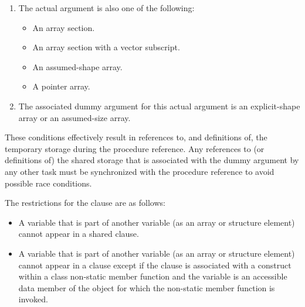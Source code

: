 {{{{\begin{enumerate}
\begin{itemize}
\item A subobject of a shared variable.

\item An object associated with a shared variable.

\item An object associated with a subobject of a shared variable.
\end{itemize} %

\item The actual argument is also one of the following:

\begin{itemize} %
\item An array section.

\item An array section with a vector subscript.

\item An assumed-shape array.

\item A pointer array.
\end{itemize} %

\item The associated dummy argument for this actual argument is an explicit-shape array 
or an assumed-size array.
\end{enumerate}

\begin{samepage}
These conditions effectively result in references to, and definitions of, the temporary 
storage during the procedure reference. Any references to (or definitions of) the shared 
storage that is associated with the dummy argument by any other task must be 
synchronized with the procedure reference to avoid possible race conditions. 
\noteend
\medskip
\fortranspecificend
\end{samepage}

\restrictions
The restrictions for the  clause are as follows:
\begin{itemize}

\cspecificstart
\item A variable that is part of another variable (as an array or structure element) cannot appear in a shared clause.
\cspecificend

\cppspecificstart
\item A variable that is part of another variable (as an array or structure
  element) cannot appear in a  clause except if the 
  clause is associated with a construct within a class non-static member
  function and the variable is an accessible data member of the object for
  which the non-static member function is invoked.
\cppspecificend


\end{itemize}}}}}
